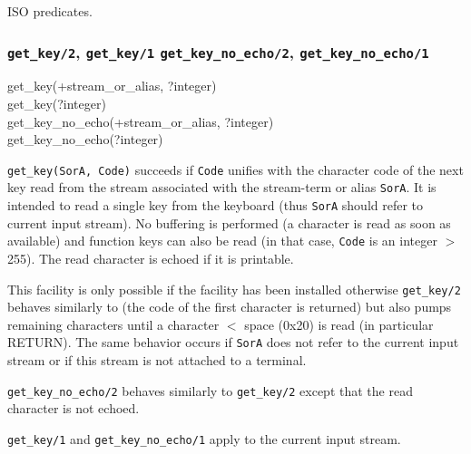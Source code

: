 \Portability

ISO predicates.

\subsubsection{\texttt{get\_key/2},
               \texttt{get\_key/1}
	       \texttt{get\_key\_no\_echo/2},
               \texttt{get\_key\_no\_echo/1}}

\begin{TemplatesOneCol}
get\_key(+stream\_or\_alias, ?integer)\\
get\_key(?integer)\\
get\_key\_no\_echo(+stream\_or\_alias, ?integer)\\
get\_key\_no\_echo(?integer)

\end{TemplatesOneCol}

\Description

\texttt{get\_key(SorA, Code)} succeeds if \texttt{Code} unifies with the
character code of the next key read from the stream associated with the
stream-term or alias \texttt{SorA}. It is intended to read a single key from
the keyboard (thus \texttt{SorA} should refer to current input stream). No
buffering is performed (a character is read as soon as available) and
function keys can also be read (in that case, \texttt{Code} is an integer $>$
255). The read character is echoed if it is printable. 

This facility is only possible if the  facility has been
installed  otherwise \texttt{get\_key/2} behaves
similarly to   (the code of the first
character is returned) but also pumps remaining characters until a character
$<$ space (0x20) is read (in particular RETURN). The same behavior 
occurs if \texttt{SorA} does not refer to the current input stream or if
this stream is not attached to a terminal.

\texttt{get\_key\_no\_echo/2} behaves similarly to \texttt{get\_key/2}
except that the read character is not echoed.

\texttt{get\_key/1} and \texttt{get\_key\_no\_echo/1} apply to the current
input stream.

